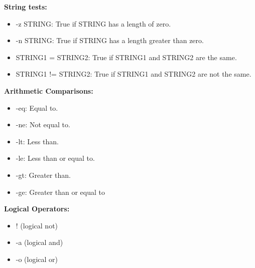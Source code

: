 \documentclass{report}
\begin{document}
    \begin{minipage}[t]{0.47\textwidth}
        \textbf{String tests:}
        \begin{itemize}
            \item -z STRING: True if STRING has a length of zero.
            \item -n STRING: True if STRING has a length greater than zero.
            \item STRING1 = STRING2: True if STRING1 and STRING2 are the same.
            \item STRING1 != STRING2: True if STRING1 and STRING2 are not the same.
        \end{itemize}
    \end{minipage}

    \pagebreak \bigbreak \noindent 
    \begin{minipage}[]{0.47\textwidth}
        \textbf{Arithmetic Comparisons:}
        \begin{itemize}
            \item -eq: Equal to.
            \item -ne: Not equal to.
            \item -lt: Less than.
            \item -le: Less than or equal to.
            \item -gt: Greater than.
            \item -ge: Greater than or equal to
        \end{itemize}
    
    \end{minipage}
    \begin{minipage}[]{0.47\textwidth}
        \textbf{Logical Operators:}
        \begin{itemize}
            \item ! (logical not)
            \item -a (logical and)
            \item -o (logical or)
        \end{itemize}
    \end{minipage}
\end{document}
